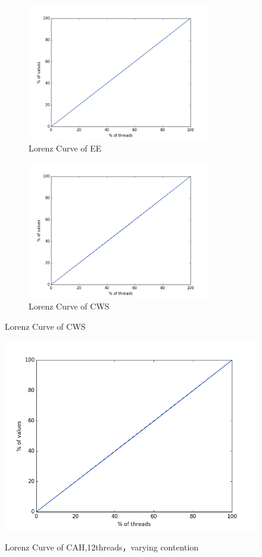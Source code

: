 \begin{figure}[!htp]
  \centering
  \begin{subfigure}{8.0cm}
    \centering
    \includegraphics[height=6.0cm]{figure/EE-varying.png}
    \caption{Lorenz Curve of EE}
  \end{subfigure}
  \hspace{2em}
  \begin{subfigure}{6.0cm}
    \centering
    \includegraphics[height=6.0cm]{figure/CWS-varing.png}
    \caption{Lorenz Curve of CWS}
  \end{subfigure}
  \label{fig:EE-CWS-varying}
\end{figure}

\begin{figure}[t]
	\centering
	\includegraphics[width=5.6in]{figure/CAH-varying.png}
	\caption{Lorenz Curve of CAH,12threads，varying contention}{}
	\label{Fig:CAH-varying}
\end{figure}

